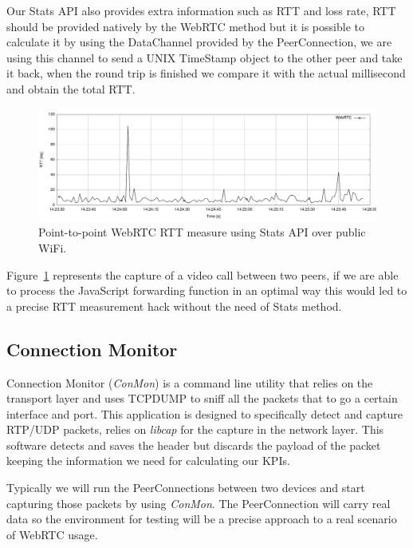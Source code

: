 Our Stats API also provides extra information such as RTT and loss rate, RTT should be provided natively by the WebRTC method but it is possible to calculate it by using the DataChannel provided by the PeerConnection, we are using this channel to send a UNIX TimeStamp object to the other peer and take it back, when the round trip is finished we compare it with the actual millisecond and obtain the total RTT.

 \begin{figure}[h]
  \centering
    \includegraphics[width=1\textwidth]{./figures/p2prttexample.pdf}
      \caption[Point-to-point WebRTC RTT measure using Stats API over public WiFi]{Point-to-point WebRTC RTT measure using Stats API over public WiFi.}
	\label{fig:p2prttexample}
\end{figure}

Figure~\ref{fig:p2prttexample} represents the capture of a video call between two peers, if we are able to process the JavaScript forwarding function in an optimal way this would led to a precise RTT measurement hack without the need of Stats method.

\subsection{Connection Monitor}

Connection Monitor ({\it ConMon}) is a command line utility that relies on the transport layer and uses TCPDUMP to sniff all the packets that to go a certain interface and port. This application is designed to specifically detect and capture RTP/UDP packets, relies on {\it libcap} for the capture in the network layer. This software detects and saves the header but discards the payload of the packet keeping the information we need for calculating our KPIs.

Typically we will run the PeerConnections between two devices and start capturing those packets by using {\it ConMon}. The PeerConnection will carry real data so the environment for testing will be a precise approach to a real scenario of WebRTC usage.

